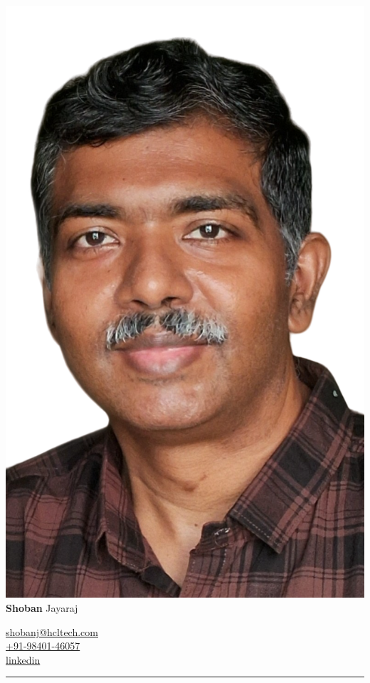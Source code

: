 \documentclass[a4paper,12pt]{article}
\newcommand\cvtitle[2]{\Huge{\bf{#1}} \Huge{#2}}
\newcommand\cvcontact[3] {
  \small {
    \faAt \quad \href{mailto:#1}{#1} \\
    \faPhone \quad \href{tel:#2}{#2} \\
    {\href{https://www.linkedin.com/in/#3/}{\faLinkedin \quad linkedin}}
  }
}
\newcommand\cvhrule{{\color{gray}\hrule}}
\begin{document}
\begin{minipage}[b]{.7\linewidth}
  \includegraphics[height=3\baselineskip]{me}
  \cvtitle{Shoban}{Jayaraj}
\end{minipage}
\begin{minipage}[b]{.3\linewidth}
  \cvcontact{shobanj@hcltech.com}{+91-98401-46057}{shobanj}
\end{minipage}

\cvhrule
\end{document}
